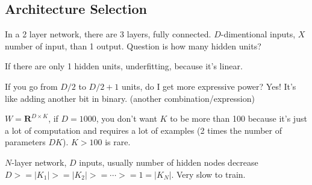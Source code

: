 \subsection{Architecture Selection}
In a 2 layer network, there are 3 layers, fully connected. $D$-dimentional inputs, $X$
number of input, than 1 output.
Question is how many hidden units? 

If there are only 1 hidden units, underfitting, because it's linear.

If you go from $D/2$ to $D/2+1$ units, do I get more expressive power?
Yes! It's like adding another bit in binary. (another
combination/expression)

$W=\mathbf{R}^{D\times K}$, if $D=1000$, you don't want $K$ to be more
than 100 because it's just a lot of computation and requires a lot of
examples (2 times the number of parameters $DK$). $K>100$ is rare.

$N$-layer network, $D$ inputs, usually number of hidden nodes decrease
$D>=|K_1|>=|K_2|>=\cdots >=1=|K_N|$. Very slow to train.


